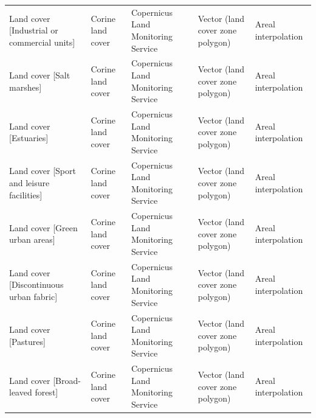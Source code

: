 \documentclass[fleqn,10pt]{wlscirep}
\begin{document}
\begin{longtable}{p{}p{}p{}p{}p{}}
                                                            Land cover [Industrial or commercial units] &                  Corine land cover  &                                         Copernicus Land Monitoring Service  &  Vector (land cover zone polygon)  &                            Areal interpolation  \\
                                                                                Land cover [Salt marshes] &                  Corine land cover  &                                         Copernicus Land Monitoring Service  &  Vector (land cover zone polygon)  &                            Areal interpolation  \\
                                                                                    Land cover [Estuaries] &                  Corine land cover  &                                         Copernicus Land Monitoring Service  &  Vector (land cover zone polygon)  &                            Areal interpolation  \\
                                                                Land cover [Sport and leisure facilities] &                  Corine land cover  &                                         Copernicus Land Monitoring Service  &  Vector (land cover zone polygon)  &                            Areal interpolation  \\
                                                                            Land cover [Green urban areas] &                  Corine land cover  &                                         Copernicus Land Monitoring Service  &  Vector (land cover zone polygon)  &                            Areal interpolation  \\
                                                                Land cover [Discontinuous urban fabric] &                  Corine land cover  &                                         Copernicus Land Monitoring Service  &  Vector (land cover zone polygon)  &                            Areal interpolation  \\
                                                                                    Land cover [Pastures] &                  Corine land cover  &                                         Copernicus Land Monitoring Service  &  Vector (land cover zone polygon)  &                            Areal interpolation  \\
                                                                        Land cover [Broad-leaved forest] &                  Corine land cover  &                                         Copernicus Land Monitoring Service  &  Vector (land cover zone polygon)  &                            Areal interpolation  \\

\end{longtable}
\end{document}
